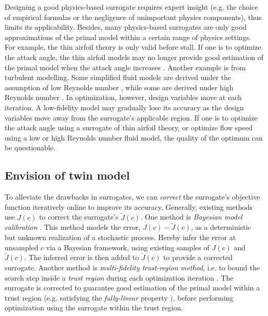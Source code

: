 \documentclass[a4paper,onecolumn]{article}
\theoremstyle{remark}
\begin{document}
\noindent Designing a good physics-based surrogate requires expert insight
(e.g. the choice of empirical formulas or the negligence of unimportant physics components),
thus limits its applicability. Besides,
many physics-based surrogates are only good approximations of the primal model
within a certain range of physics settings. 
For example, the thin airfoil theory is only valid before stall. 
If one is to optimize the attack angle, the thin airfoil models may no longer 
provide good estimation of the primal model when the attack angle increases \cite{thin airfoil}.
Another example is from turbulent modelling.
Some simplified fluid models are derived under the assumption of low Reynolds number
\cite{turbulent modeling R low}, while some are derived under high Reynolds number 
\cite{turbulent modeling R high}.
In optimization, however, design variables 
move at each iteration. A low-fidelity model may gradually lose its accuracy 
as the design variables move away from the surrogate's applicable region.
If one is to optimize the attack angle using a surrogate of thin airfoil theory, 
or optimize flow speed using a low or high Reynolds number fluid model, 
the quality of the optimum can be questionable.\\


\subsection{Envision of twin model}
\noindent To alleviate the drawbacks in surrogates, 
we can \emph{correct} the surrogate's objective function
iteratively online to improve its accuracy. Generally, existing methods
use $J(c)$ to correct the surrogate's $\tilde{J}(c)$.
One method is \emph{Bayesian model calibration}
\cite{KennedyOhagan1, andrewras}. This method models the error,
$J(c) - \tilde{J}(c)$, as a deterministic but unknown  
realization of a stochastic process.
Hereby infer the error at unsampled $c$ via a Bayesian framework,
using existing samples of $J(c)$ and $\tilde{J}(c)$.
The inferred error is then added to $\tilde{J}(c)$ to provide a corrected surrogate.
Another method is \emph{multi-fidelity trust-region method}, i.e. to bound the search step
inside a \emph{trust region} during each optimization iteration \cite{trustregionwild}.
The surrogate is corrected to guarantee good estimation
of the primal model within a trust region
(e.g. satisfying the \emph{fully-linear} property \cite{trustregionconn}),
before performing optimization using the surrogate within the trust region.\\
\end{document}
